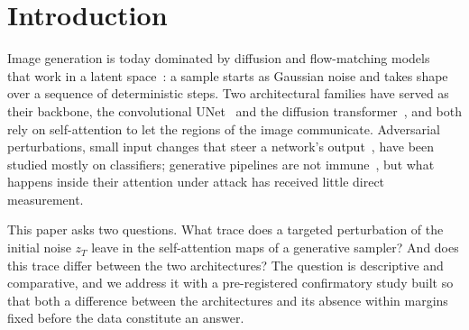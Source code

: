 \documentclass{article}
\begin{document}
\section{Introduction}\label{sec:introduction}

Image generation is today dominated by diffusion and flow-matching models~\cite{ho2020denoising,lipman2023flow} that work in a latent space~\cite{rombach2022high}: a sample starts as Gaussian noise and takes shape over a sequence of deterministic steps. Two architectural families have served as their backbone, the convolutional UNet~\cite{dhariwal2021diffusion} and the diffusion transformer~\cite{peebles2023scalable}, and both rely on self-attention to let the regions of the image communicate. Adversarial perturbations, small input changes that steer a network's output~\cite{szegedy2013intriguing,goodfellow2014explaining,madry2018towards}, have been studied mostly on classifiers; generative pipelines are not immune~\cite{salman2023raising}, but what happens inside their attention under attack has received little direct measurement.

This paper asks two questions. What trace does a targeted perturbation of the initial noise $z_T$ leave in the self-attention maps of a generative sampler? And does this trace differ between the two architectures? The question is descriptive and comparative, and we address it with a pre-registered confirmatory study built so that both a difference between the architectures and its absence within margins fixed before the data constitute an answer.
\end{document}
